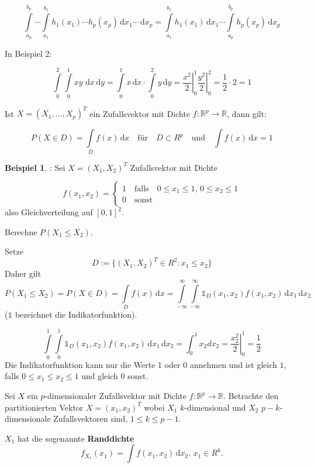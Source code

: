 \documentclass[12pt, a4paper]{article}
\theoremstyle{plain}
\theoremstyle{definition}
\newtheorem{beispiel}[thm]{Beispiel}
\newcommand{\R}{\mathbb{R}}
\newcommand{\1}{\mathds{1}}
\renewcommand{\d}{\,\mathrm{d}}
\providecommand{\mtext}[1]{\quad \text{#1} \quad}
\providecommand{\eval}[1]{\left. #1 \right|}
\begin{document}
\[ \int\limits_{a_p}^{b_p} \cdots \int\limits_{a_1}^{b_1}   h_1(x_1) \cdots h_p(x_p) \d x_1 \cdots \d x_p = \int\limits_{a_1}^{b_1} h_1(x_1) \d x_1 \cdots \int\limits_{a_p}^{b_p} h_p(x_p) \d x_p \]

In Beispiel 2:

\[ \int\limits_0^2 \int\limits_0^1 x y\, \d x \d y =  \int\limits_0^1 x  \d x \cdot \int\limits_0^2 y \d y = \eval{\frac{x^2}{2}}_0^1 \eval{\frac{y^2}{2}}_0^2  = \frac{1}{2} \cdot 2 = 1 \]

Ist $X = (X_1, \ldots, X_p)^T $ ein Zufallsvektor mit Dichte $f: \R^p \to \R$, dann gilt:

\[ P(X \in D) = \int\limits_D f(x) \d x \mtext{für} D \subset R^p \mtext{und} \int f(x) \d x = 1 \]

\begin{beispiel}: Sei $X = (X_1, X_2)^T$ Zufallsvektor mit Dichte

\[
f(x_1, x_2) = \begin{cases}
1 \mtext{falls} 0 \leq x_1 \leq 1, \, 0 \leq x_2 \leq 1 \\ 0 \mtext{sonst} \end{cases}\] also Gleichverteilung auf $[0,1]^2$.
\end{beispiel}

Berechne $P(X_1 \leq X_2)$.

Setze 
\[D := \{ (X_1, X_2)^T \in R^2: x_1 \leq x_2 \}\] Daher gilt 
\[ P(X_1 \leq X_2) = P(X \in D) = \int\limits_D f(x) \d x = \int\limits_{-\infty}^{\infty} \int\limits_{-\infty}^{\infty}  \1_D (x_1, x_2) f(x_1, x_2) \d x_1 \d x_2\] ($\1$ bezeichnet die Indikatorfunktion).

\[ \int\limits_0^1 \int\limits_0^1 \1_D (x_1, x_2) f(x_1, x_2) \d x_1 \d x_2 = \int_0^1 x_2 dx_2 = \eval{\frac{x_2^2}{2}}_0^1 = \frac{1}{2} \] Die Indikatorfunktion kann nur die Werte 1 oder 0 annehmen und ist gleich $1$, falls $0 \leq x_1 \leq x_2 \leq 1$ und gleich $0$ sonst.

Sei $ X $ ein $p$-dimensionaler Zufallsvektor mit Dichte $ f:\R^p \to \R  $. Betrachte den partitionierten Vektor $ X= (x_1, x_2)^T $ wobei $X_1$ $k$-dimensional und $X_2$ $p-k$-dimensionale Zufallsvektoren sind, $1 \leq k \leq p-1$.

$X_1$ hat die sogenannte \textbf{Randdichte} \[f_{X_1}(x_1) = \int f(x_1, x_2) \d x_2,\, x_1 \in R^k . \]

\end{document}
